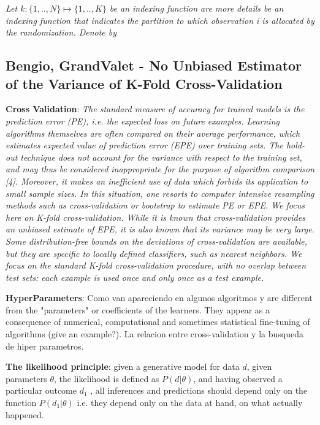 \textit{Let $k : \{1,..,N\} \mapsto \{1, .., K\}$ be an indexing function are more details be an indexing
function that indicates the partition to which observation i is allocated by the randomization. Denote by}


\subsection{Bengio, GrandValet - No Unbiased Estimator of the Variance of K-Fold Cross-Validation}
\textbf{Cross Validation}: 
\textit{The standard measure of accuracy for trained models is the prediction error (PE), i.e. the expected loss on future examples. Learning algorithms themselves are often compared on their average performance, which estimates expected value of prediction error (EPE) over training sets.
The hold-out technique does not account for the variance with respect to the training set, and may thus be considered inappropriate for the purpose of algorithm comparison [4]. Moreover, it makes an inefficient use of data which forbids its application to small sample sizes. In this situation, one resorts to computer intensive resampling methods such as cross-validation or bootstrap to estimate PE or EPE. We focus here on K-fold cross-validation. While it is known that cross-validation provides an unbiased estimate of EPE, it is also known that its variance may be very large.
Some distribution-free bounds on the deviations of cross-validation are available, but they are specific to locally defined classifiers, such as nearest neighbors.
We focus on the standard K-fold cross-validation procedure, with no overlap between test sets: each example is used once and only once as a test example.
}




\textbf{HyperParameters}:
Como van apareciendo en algunos algoritmos y are different from the "parameters" or coefficients of the learners. They appear as a consequence of numerical, computational and sometimes statistical fine-tuning of algorithms (give an example?). 
La relacion entre cross-validation y la busqueda de hiper parametros. 

\textit{}

\textit{}


\textbf{The likelihood principle}: given a generative model for data $d$, given parameters $\theta$, the likelihood is defined as $P (d | \theta)$, and having observed a particular outcome $d_1$ , all inferences and predictions should depend only on the function $P(d_1 | \theta)$ i.e. they depend only on the data at hand, on what actually happened. 

